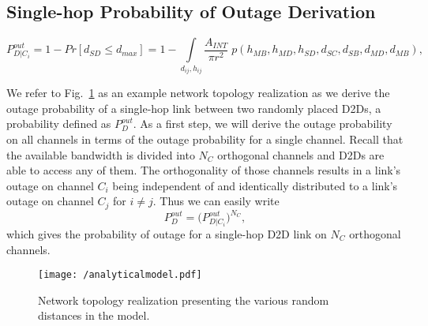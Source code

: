 \documentclass[10pt, final, journal, letterpaper,oneside, twocolumn]{IEEEtran}
\newcounter{EquationCounter}
\begin{document}
\subsection{Single-hop Probability of Outage Derivation}
\label{sec:single_hop_outage}
\begin{figure*}[!t]
\normalsize
\setcounter{EquationCounter}{\value{equation}}
\setcounter{equation}{11}
\begin{equation}
\label{eq:outage_general}
P^{out}_{D|C_{i}} = 1- Pr[d_{SD} \leq d_{max}] = 1 - \int\limits_{d_{ij},h_{ij}}  \dfrac{A_{INT}}{\pi r^2} \; p(h_{MB},h_{MD},h_{SD},d_{SC},d_{SB},d_{MD},d_{MB}),
\end{equation}
\setcounter{equation}{\value{EquationCounter}}
\hrulefill
\vspace*{-20pt} 
\end{figure*}
We refer to Fig.~\ref{fig:analyticalmodel} as an example network topology realization as we derive the outage probability of a single-hop link between two randomly placed D2Ds, a probability defined as $P^{out}_{D}$.  As a first step, we will derive the outage probability on all channels in terms of the outage probability for a single channel.  Recall that the available bandwidth is divided into $N_{C}$ orthogonal channels and D2Ds are able to access any of them.  The orthogonality of those channels results in a link's outage on channel $C_{i}$ being independent of and identically distributed to a link's outage on channel $C_{j}$ for $i\neq j$.  Thus we can easily write 
\begin{equation} 
P^{out}_{D} = \Big(P^{out}_{D|C_{i}}\Big)^{N_C},
\label{eq:m2a_multi_channel_prob3}
\end{equation}
which gives the probability of outage for a single-hop D2D link on $N_C$ orthogonal channels.  
\begin{figure}[htp]
\center
 \texttt{[image: /analyticalmodel.pdf]}
  \caption[]{Network topology realization presenting the various random distances in the model.} 
  \label{fig:analyticalmodel}
\end{figure}
\end{document}

